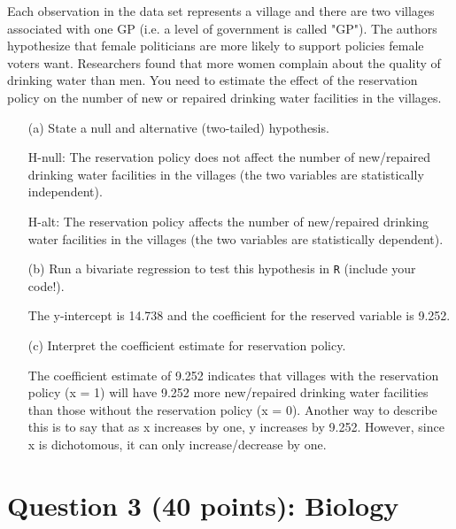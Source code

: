 \documentclass[12pt,letterpaper]{article}
\begin{document}
\noindent Each observation in the data set represents a village and there are two villages associated with one GP (i.e. a level of government is called "GP"). The authors hypothesize that female politicians are more likely to support policies female voters want. Researchers found that more women complain about the quality of drinking water than men. You need to estimate the effect of the reservation policy on the number of new or repaired drinking water facilities in the villages.
\vspace{.2cm}

\begin{enumerate}
	\item [(a)] State a null and alternative (two-tailed) hypothesis. 
	\vspace{.2cm}
	
H-null: The reservation policy does not affect the number of new/repaired drinking water facilities in the villages (the two variables are statistically independent).

H-alt: The reservation policy affects the number of new/repaired drinking water facilities in the villages (the two variables are statistically dependent).

	\vspace{1cm}
	\item [(b)] Run a bivariate regression to test this hypothesis in \texttt{R} (include your code!).
	\vspace{.2cm}
	


The y-intercept is 14.738 and the coefficient for the reserved variable is 9.252.	
	\vspace{1cm}
	
	\item [(c)] Interpret the coefficient estimate for reservation policy. 
	\vspace{.2cm}
	
The coefficient estimate of 9.252 indicates that villages with the reservation policy (x = 1) will have 9.252 more new/repaired drinking water facilities than those without the reservation policy (x = 0). Another way to describe this is to say that as x increases by one, y increases by 9.252. However, since x is dichotomous, it can only increase/decrease by one.

\end{enumerate}

\newpage
	\section*{Question 3 (40 points): Biology}
\end{document}
